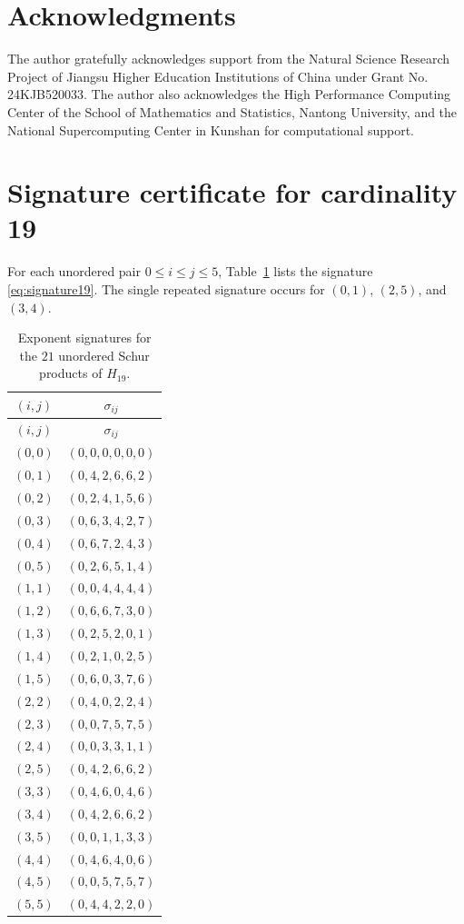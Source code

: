\documentclass[11pt,a4paper]{article}
\begin{document}
\section*{Acknowledgments}

The author gratefully acknowledges support from the Natural Science Research
Project of Jiangsu Higher Education Institutions of China under Grant No.
24KJB520033.  The author also acknowledges the High Performance Computing
Center of the School of Mathematics and Statistics, Nantong University, and
the National Supercomputing Center in Kunshan for computational support.

\appendix

\section{Signature certificate for cardinality 19}\label{app:c19cert}

For each unordered pair $0\leq i\leq j\leq5$, Table~\ref{tab:sig19} lists the
signature \eqref{eq:signature19}.  The single repeated signature occurs for
$(0,1)$, $(2,5)$, and $(3,4)$.

\begin{longtable}{c@{\qquad}c}
\caption{Exponent signatures for the $21$ unordered Schur products of
$H_{19}$.}\label{tab:sig19}\\
\toprule
$(i,j)$ & $\sigma_{ij}$\\
\midrule
\endfirsthead
\toprule
$(i,j)$ & $\sigma_{ij}$\\
\midrule
\endhead
\bottomrule
\endfoot
$(0,0)$ & $(0,0,0,0,0,0)$\\
$(0,1)$ & $(0,4,2,6,6,2)$\\
$(0,2)$ & $(0,2,4,1,5,6)$\\
$(0,3)$ & $(0,6,3,4,2,7)$\\
$(0,4)$ & $(0,6,7,2,4,3)$\\
$(0,5)$ & $(0,2,6,5,1,4)$\\
$(1,1)$ & $(0,0,4,4,4,4)$\\
$(1,2)$ & $(0,6,6,7,3,0)$\\
$(1,3)$ & $(0,2,5,2,0,1)$\\
$(1,4)$ & $(0,2,1,0,2,5)$\\
$(1,5)$ & $(0,6,0,3,7,6)$\\
$(2,2)$ & $(0,4,0,2,2,4)$\\
$(2,3)$ & $(0,0,7,5,7,5)$\\
$(2,4)$ & $(0,0,3,3,1,1)$\\
$(2,5)$ & $(0,4,2,6,6,2)$\\
$(3,3)$ & $(0,4,6,0,4,6)$\\
$(3,4)$ & $(0,4,2,6,6,2)$\\
$(3,5)$ & $(0,0,1,1,3,3)$\\
$(4,4)$ & $(0,4,6,4,0,6)$\\
$(4,5)$ & $(0,0,5,7,5,7)$\\
$(5,5)$ & $(0,4,4,2,2,0)$\\
\end{longtable}
\end{document}
